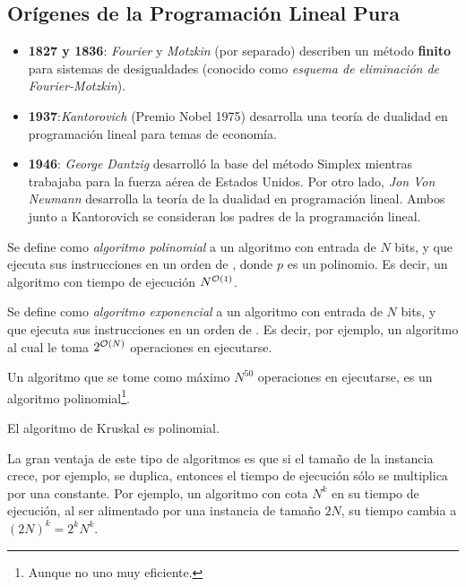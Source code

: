 \subsection*{Orígenes de la Programación Lineal Pura}
\begin{itemize}
    \item \textbf{1827 y 1836}: \textit{Fourier} y \textit{Motzkin} (por separado) describen un método \textbf{finito} para sistemas de desigualdades (conocido como \textit{esquema de eliminación de Fourier-Motzkin}).
    \item \textbf{1937}:\textit{Kantorovich} (Premio Nobel 1975) desarrolla una teoría de dualidad en programación lineal para temas de economía. 
    \item \textbf{1946}: \textit{George Dantzig} desarrolló la base del método Simplex mientras trabajaba para la fuerza aérea de Estados Unidos. Por otro lado, \textit{Jon Von Neumann} desarrolla la teoría de la dualidad en programación lineal.  Ambos junto a Kantorovich se consideran los padres de la programación lineal.
\end{itemize}

\begin{defi}
Se define como \textit{algoritmo polinomial} a un algoritmo con entrada de $N$ bits, y que ejecuta sus instrucciones en un orden de \Ord[p(N)], donde $p$ es un polinomio. Es decir, un algoritmo con tiempo de ejecución $N^{\Ord[1]}$.
\end{defi}
\begin{defi}
Se define como \textit{{algoritmo exponencial}} a un algoritmo con entrada de $N$ bits, y que ejecuta sus instrucciones en un orden de \Ord[e^{N}]. Es decir, por ejemplo, un algoritmo al cual le toma $2^{\Ord[N]}$ operaciones en ejecutarse.
\end{defi}
\begin{eje}
Un algoritmo que se tome como máximo $N^{50}$ operaciones en ejecutarse, es un algoritmo polinomial\footnote{Aunque no uno muy eficiente.}.
\end{eje}
\begin{eje}
El algoritmo de Kruskal es polinomial.
\end{eje}
La gran ventaja de este tipo de algoritmos es que si el tamaño de la instancia crece, por ejemplo, se duplica, entonces el tiempo de ejecución sólo se multiplica por una constante. Por ejemplo, un algoritmo con cota $N^k$ en su tiempo de ejecución, al ser alimentado por una instancia de tamaño $2N$, su tiempo cambia a $(2N)^{k}=2^k N^k$.

